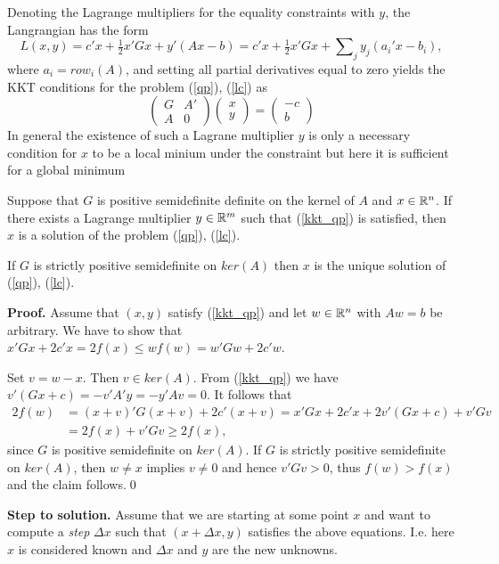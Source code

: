 \noindent
Denoting the Lagrange multipliers for the equality constraints with $y$, the
Langrangian has the form 
$$
L(x,y)=c'x+\tfrac{1}{2}x'Gx+y'(Ax-b)=
c'x+\tfrac{1}{2}x'Gx+\sum\nolimits_jy_j(a_i'x-b_i),
$$
where $a_i=row_i(A)$, and setting all partial 
derivatives equal to zero yields the KKT conditions for the problem (\ref{qp}), (\ref{lc}) as
%
\begin{equation}
\label{kkt_qp}
\begin{pmatrix}
G & A'\\
A & 0
\end{pmatrix}
\begin{pmatrix}
x\\
y
\end{pmatrix}
=
\begin{pmatrix}
-c\\
b
\end{pmatrix}
\end{equation}  
%
In general the existence of such a Lagrane multiplier $y$ is only a necessary
condition for $x$ to be a local minium under the constraint but here it is
sufficient for a global minimum
%
\begin{prop}
\label{prop:kkt_qp}
Suppose that $G$ is positive semidefinite definite on the kernel of $A$ and 
$x\in{\mathbb R}^n$. If there exists a Lagrange multiplier $y\in{\mathbb R}^m$ such that
(\ref{kkt_qp}) is satisfied, then $x$ is a solution of  the problem (\ref{qp}),
(\ref{lc}). 

If $G$ is strictly positive semidefinite on $ker(A)$ then $x$ is the unique
solution of (\ref{qp}), (\ref{lc}). 
\end{prop}
%
\textbf{Proof.}
Assume that $(x,y)$ satisfy (\ref{kkt_qp}) and let $w\in{\mathbb R}^n$ with $Aw=b$ be
arbitrary. We have to show that $x'Gx+2c'x=2f(x)\leq wf(w)=w'Gw+2c'w$. 

\noindent
Set $v=w-x$. Then $v\in ker(A)$. From (\ref{kkt_qp}) we have 
$v'(Gx+c)=-v'A'y=-y'Av=0$. It follows that
%
\begin{align*}
2f(w) &= 
(x+v)'G(x+v)+2c'(x+v) =  
x'Gx+2c'x+2v'(Gx+c)+v'Gv\\&=
2f(x)+v'Gv\geq 2f(x),
\end{align*}
%
since $G$ is positive semidefinite on $ker(A)$. 
If $G$ is strictly positive semidefinite on $ker(A)$, 
then $w\neq x$ implies $v\neq 0$ and hence $v'Gv>0$,
thus $f(w)>f(x)$ and the claim follows.\qed

\noindent
\textbf{Step to solution.}
Assume that we are starting at some point $x$ and want to compute a 
\textit{step} $\Delta x$ such that $(x+\Delta x,y)$ 
satisfies the above equations. I.e. here $x$ is considered known and
$\Delta x$ and $y$ are the new unknowns.

